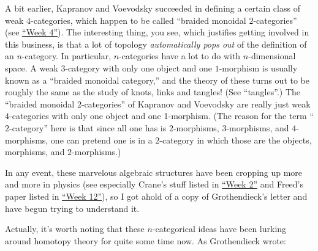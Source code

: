 \documentclass{article}
\begin{document}
A bit earlier, Kapranov and Voevodsky succeeded in defining a certain
class of weak \(4\)-categories, which happen to be called ``braided
monoidal \(2\)-categories'' (see \protect\hyperlink{week4}{``Week 4''}).
The interesting thing, you see, which justifies getting involved in this
business, is that a lot of topology \emph{automatically pops out} of the
definition of an \(n\)-category. In particular, \(n\)-categories have a
lot to do with \(n\)-dimensional space. A weak \(3\)-category with only
one object and one \(1\)-morphism is usually known as a ``braided
monoidal category,'' and the theory of these turns out to be roughly the
same as the study of knots, links and tangles! (See ``tangles''.) The
``braided monoidal \(2\)-categories'' of Kapranov and Voevodsky are
really just weak \(4\)-categories with only one object and one
1-morphism. (The reason for the term ``\(2\)-category'' here is that
since all one has is \(2\)-morphisms, \(3\)-morphisms, and
\(4\)-morphisms, one can pretend one is in a \(2\)-category in which
those are the objects, morphisms, and \(2\)-morphisms.)

In any event, these marvelous algebraic structures have been cropping up
more and more in physics (see especially Crane's stuff listed in
\protect\hyperlink{week2}{``Week 2''} and Freed's paper listed in
\protect\hyperlink{week12}{``Week 12''}), so I got ahold of a copy of
Grothendieck's letter and have begun trying to understand it.

Actually, it's worth noting that these \(n\)-categorical ideas have been
lurking around homotopy theory for quite some time now. As Grothendieck
wrote:
\end{document}
